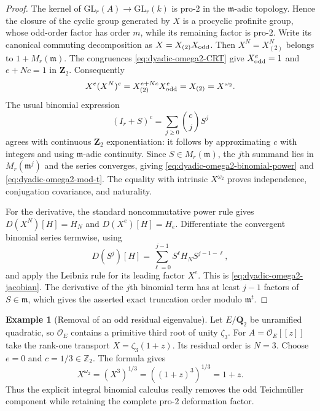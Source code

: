 \documentclass[11pt]{article}
\theoremstyle{definition}
\newtheorem{example}[theorem]{Example}
\begin{document}
\begin{proof}
The kernel of
$\mathrm{GL}_r(A)\to\mathrm{GL}_r(k)$
is pro-$2$ in the $\mathfrak m$-adic
topology.  Hence the closure of the
cyclic group generated by $X$ is a
procyclic profinite group, whose odd-order
factor has order $m$, while its remaining
factor is pro-$2$.  Write its canonical
commuting decomposition as
$X=X_{(2)}X_{\rm odd}$.
Then $X^N=X_{(2)}^N$ belongs to
$1+M_r(\mathfrak m)$.
The congruences
\eqref{eq:dyadic-omega2-CRT} give
$X_{\rm odd}^e=1$ and
$e+Nc=1$ in $\mathbf Z_2$.
Consequently
\[
 X^e(X^N)^c
 =X_{(2)}^{e+Nc}X_{\rm odd}^e
 =X_{(2)}=X^{\omega_2}.
\]
The usual binomial expression
\[
 (I_r+S)^c=\sum_{j\ge0}\binom cj S^j
\]
agrees with continuous $\mathbf Z_2$
exponentiation: it follows by
approximating $c$ with integers and
using $\mathfrak m$-adic continuity.
Since $S\in M_r(\mathfrak m)$,
the $j$th summand lies in
$M_r(\mathfrak m^j)$ and the
series converges, giving
\eqref{eq:dyadic-omega2-binomial-power}
and \eqref{eq:dyadic-omega2-mod-t}.
The equality with intrinsic
$X^{\omega_2}$ proves independence,
conjugation covariance, and naturality.

For the derivative, the standard
noncommutative power rule gives
$D(X^N)[H]=H_N$ and
$D(X^e)[H]=H_e$.
Differentiate the convergent binomial
series termwise, using
\[
 D(S^j)[H]=
 \sum_{\ell=0}^{j-1}
 S^\ell H_N S^{j-1-\ell},
\]
and apply the Leibniz rule for its
leading factor $X^e$.  This is
\eqref{eq:dyadic-omega2-jacobian}.
The derivative of the $j$th binomial
term has at least $j-1$ factors of
$S\in\mathfrak m$, which gives
the asserted exact truncation
order modulo $\mathfrak m^t$.
\end{proof}

\begin{example}[Removal of an odd residual eigenvalue]
\label{ex:dyadic-omega2-odd-teich}
Let $E/\mathbf Q_2$ be unramified quadratic,
so $\mathcal O_E$ contains a primitive
third root of unity $\zeta_3$.
For $A=\mathcal O_E[[z]]$ take the rank-one
transport $X=\zeta_3(1+z)$.
Its residual order is $N=3$.
Choose $e=0$ and $c=1/3\in\mathbb Z_2$.
The formula gives
\[
 X^{\omega_2}
 =\left(X^3\right)^{1/3}
 =\left((1+z)^3\right)^{1/3}
 =1+z.
\]
Thus the explicit integral binomial
calculus really removes the odd
Teichm\"uller component while retaining
the complete pro-$2$ deformation factor.
\end{example}
\end{document}
